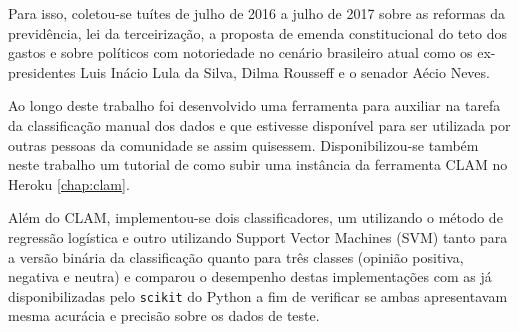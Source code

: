 Para isso, coletou-se tuítes de julho de 2016 a julho de 2017 sobre as reformas da previdência, lei
da terceirização, a proposta de emenda constitucional do teto dos gastos e sobre políticos
com notoriedade no cenário brasileiro atual como os ex-presidentes Luis Inácio Lula da Silva,
Dilma Rousseff e o senador Aécio Neves.

Ao longo deste trabalho foi desenvolvido uma ferramenta para auxiliar na tarefa da classificação 
manual dos dados e que estivesse disponível para ser utilizada por outras pessoas da comunidade
se assim quisessem. Disponibilizou-se também neste trabalho um tutorial de como subir uma instância
da ferramenta CLAM no Heroku \ref{chap:clam}.

Além do CLAM, implementou-se dois classificadores, um utilizando o método de regressão logística
e outro utilizando Support Vector Machines (SVM) tanto para a versão binária da classificação quanto
para três classes (opinião positiva, negativa e neutra) e comparou o desempenho destas implementações
com as já disponibilizadas pelo \texttt{scikit} do Python a fim de verificar se ambas apresentavam mesma
acurácia e precisão sobre os dados de teste.